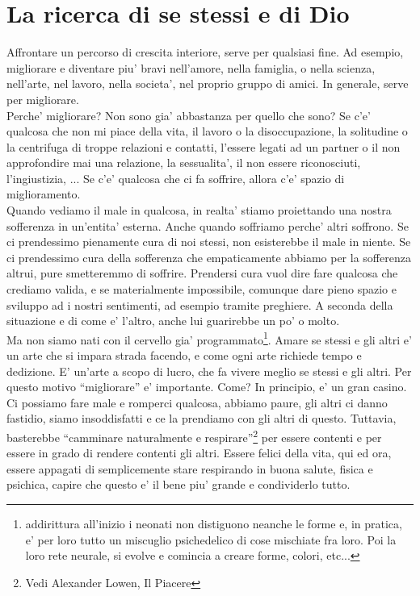 \section{La ricerca di se stessi e di Dio}
\label{laricerca}

Affrontare un percorso di crescita interiore, serve per qualsiasi fine. Ad esempio, migliorare e diventare piu' bravi nell'amore, nella famiglia, o nella scienza, nell'arte, nel lavoro, nella societa', nel proprio gruppo di amici. In generale, serve per migliorare.\\
Perche' migliorare? Non sono gia' abbastanza per quello che sono? Se c'e' qualcosa che non mi piace della vita, il lavoro o la disoccupazione, la solitudine o la centrifuga di troppe relazioni e contatti, l'essere legati ad un partner o il non approfondire mai una relazione, la sessualita', il non essere riconosciuti, l'ingiustizia, ... Se c'e' qualcosa che ci fa soffrire, allora c'e' spazio di miglioramento.\\
Quando vediamo il male in qualcosa, in realta' stiamo proiettando una nostra sofferenza in un'entita' esterna. Anche quando soffriamo perche' altri soffrono. Se ci prendessimo pienamente cura di noi stessi, non esisterebbe il male in niente. Se ci prendessimo cura della sofferenza che empaticamente abbiamo per la sofferenza altrui, pure smetteremmo di soffrire. Prendersi cura vuol dire fare qualcosa che crediamo valida, e se materialmente impossibile, comunque dare pieno spazio e sviluppo ad i nostri sentimenti, ad esempio tramite preghiere. A seconda della situazione e di come e' l'altro, anche lui guarirebbe un po' o molto.\\
Ma non siamo nati con il cervello gia' programmato\footnote{addirittura all'inizio i neonati non distiguono neanche le forme e, in pratica, e' per loro tutto un miscuglio psichedelico di cose mischiate fra loro. Poi la loro rete neurale, si evolve e comincia a creare forme, colori, etc...}. Amare se stessi e gli altri e' un arte che si impara strada facendo, e come ogni arte richiede tempo e dedizione. E' un'arte a scopo di lucro, che fa vivere meglio se stessi e gli altri. Per questo motivo ``migliorare'' e' importante. Come? In principio, e' un gran casino. Ci possiamo fare male e romperci qualcosa, abbiamo paure, gli altri ci danno fastidio, siamo insoddisfatti e ce la prendiamo con gli altri di questo. Tuttavia, basterebbe ``camminare naturalmente e respirare''\footnote{Vedi Alexander Lowen, Il Piacere} per essere contenti e per essere in grado di rendere contenti gli altri. Essere felici della vita, qui ed ora, essere appagati di semplicemente stare respirando in buona salute, fisica e psichica, capire che questo e' il bene piu' grande e condividerlo tutto.

